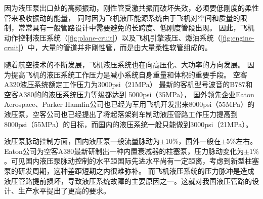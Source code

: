 因为液压泵出口处的高频振动，刚性管受激共振而破坏失效，必须要低刚度的柔性管来吸收振动的能量，
同时因为飞机液压能源系统由于飞机对空间和质量的限制，常常具有一般管路设计中需要避免的长跨度、低刚度管段出现\cite{gaofeng2013}。
因此，飞机动作控制液压系统（\ref{fig:plane-cruit}）以及飞机引擎液压、燃油系统（\ref{fig:engine-cruit}）中，大量的管道并非刚性管，而是由大量柔性软管组成的。


随着航空技术的不断发展，飞机液压系统也在向高压化、大功率的方向发展。
因为提高飞机的液压系统工作压力是减小系统自身重量和体积的重要手段。
空客A320液压系统额定工作压力为3000psi（21MPa）
最新的客机型号波音的B787和空客A380的的液压系统压力等级都达到 5000psi（35MPa）\cite{lavooij1991}，
国外领先企业Eaton Aerospace、Parker Hannfin公司也已经为军用飞机开发出来8000psi（55MPa）的液压泵，空客公司也已经提出了将起落架刹车制动液压管路工作压力提高到8000psi（55MPa）的目标，而国内的液压系统一般只能做到3000psi（21MPa）。


\begin{figure}
	\centering
	\hspace{1cm}
	\label{fig:plane-hose}
\end{figure}





液压泵脉动控制方面，国内液压泵一般流量脉动为$\pm10\%$，国外一般在$ \pm5\% $左右\cite{lijun2007}。Eaton公司为空客A380最新研制出一种内置衰减器的柱塞泵，压力脉动变化为$ \pm 1\%$。可见国内液压泵脉动控制的水平距国际先进水平尚有一定距离，考虑到新型柱塞泵的研发周期，这种差距短期之内很难弥补。
而飞机液压系统的压力脉冲是造成液压管路提前损坏，导致液压系统故障的主要原因之一。这就对我国液压管路的设计、生产水平提出了更高的要求。





